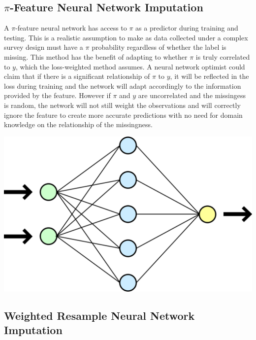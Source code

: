 \documentclass[12pt,twoside]{reedthesis}
\begin{document}
\subsection{\texorpdfstring{\(\pi\)-Feature Neural Network
Imputation}{\textbackslash{}pi-Feature Neural Network Imputation}}\label{pi-feature-neural-network-imputation}

A \(\pi\)-feature neural network has access to \(\pi\) as a predictor
during training and testing. This is a realistic assumption to make as
data collected under a complex survey design must have a \(\pi\)
probability regardless of whether the label is missing. This method has
the benefit of adapting to whether \(\pi\) is truly correlated to \(y\),
which the loss-weighted method assumes. A neural network optimist could
claim that if there is a significant relationship of \(\pi\) to \(y\),
it will be reflected in the loss during training and the network will
adapt accordingly to the information provided by the feature. However if
\(\pi\) and \(y\) are uncorrelated and the missingess is random, the
network will not still weight the observations and will correctly ignore
the feature to create more accurate predictions with no need for domain
knowledge on the relationship of the missingness.

\includegraphics{figure/network.png}

\subsection{Weighted Resample Neural Network
Imputation}\label{weighted-resample-neural-network-imputation}
\end{document}

